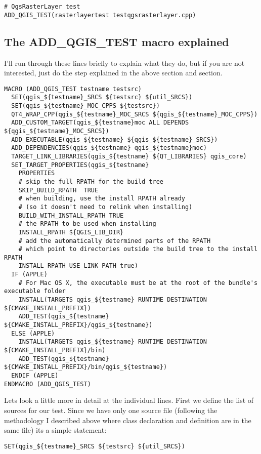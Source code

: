 \begin{verbatim}
# QgsRasterLayer test
ADD_QGIS_TEST(rasterlayertest testqgsrasterlayer.cpp)
\end{verbatim}

\hypertarget{toc51}{}
\subsection{The ADD\_QGIS\_TEST macro explained}
I'll run through these lines briefly to explain what they do, but if you are
not interested, just do the step explained in the above section and section.

\begin{verbatim}
MACRO (ADD_QGIS_TEST testname testsrc)
  SET(qgis_${testname}_SRCS ${testsrc} ${util_SRCS})
  SET(qgis_${testname}_MOC_CPPS ${testsrc})
  QT4_WRAP_CPP(qgis_${testname}_MOC_SRCS ${qgis_${testname}_MOC_CPPS})
  ADD_CUSTOM_TARGET(qgis_${testname}moc ALL DEPENDS ${qgis_${testname}_MOC_SRCS})
  ADD_EXECUTABLE(qgis_${testname} ${qgis_${testname}_SRCS})
  ADD_DEPENDENCIES(qgis_${testname} qgis_${testname}moc)
  TARGET_LINK_LIBRARIES(qgis_${testname} ${QT_LIBRARIES} qgis_core)
  SET_TARGET_PROPERTIES(qgis_${testname}
    PROPERTIES
    # skip the full RPATH for the build tree
    SKIP_BUILD_RPATH  TRUE
    # when building, use the install RPATH already
    # (so it doesn't need to relink when installing)
    BUILD_WITH_INSTALL_RPATH TRUE
    # the RPATH to be used when installing
    INSTALL_RPATH ${QGIS_LIB_DIR}
    # add the automatically determined parts of the RPATH
    # which point to directories outside the build tree to the install RPATH
    INSTALL_RPATH_USE_LINK_PATH true)
  IF (APPLE)
    # For Mac OS X, the executable must be at the root of the bundle's executable folder
    INSTALL(TARGETS qgis_${testname} RUNTIME DESTINATION ${CMAKE_INSTALL_PREFIX})
    ADD_TEST(qgis_${testname} ${CMAKE_INSTALL_PREFIX}/qgis_${testname})
  ELSE (APPLE)
    INSTALL(TARGETS qgis_${testname} RUNTIME DESTINATION ${CMAKE_INSTALL_PREFIX}/bin)
    ADD_TEST(qgis_${testname} ${CMAKE_INSTALL_PREFIX}/bin/qgis_${testname})
  ENDIF (APPLE)
ENDMACRO (ADD_QGIS_TEST)
\end{verbatim}

Lets look a little more in detail at the individual lines. First we define the
list of sources for our test. Since we have only one source file (following the
methodology I described above where class declaration and definition are in the
same file) its a simple statement:

\begin{verbatim}
SET(qgis_${testname}_SRCS ${testsrc} ${util_SRCS})
\end{verbatim}

